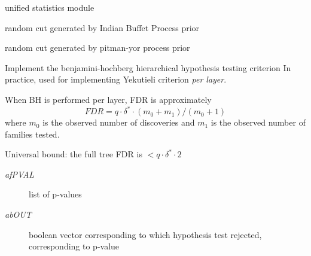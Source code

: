 \documentclass[letterpaper,10pt,english]{sphinxmanual}
\begin{document}
\begin{fulllineitems}
\end{fulllineitems}

\label{index:module-halla.stats}
unified statistics module

\begin{fulllineitems}
\label{index:halla.stats.IBP_cut}
random cut generated by Indian Buffet Process prior

\end{fulllineitems}


\begin{fulllineitems}
\label{index:halla.stats.PY_cut}
random cut generated by pitman-yor process prior

\end{fulllineitems}


\begin{fulllineitems}
\label{index:halla.stats.bh}
Implement the benjamini-hochberg hierarchical hypothesis testing criterion 
In practice, used for implementing Yekutieli criterion \emph{per layer}.

When BH is performed per layer, FDR is approximately
\begin{equation}FDR = q \cdot \delta^{*} \cdot(m_0 + m_1)/(m_0+1)\end{equation}
where $m_0$ is the observed number of discoveries and $m_1$ is the observed number of families tested.

Universal bound: the full tree FDR is $< q \cdot \delta^{*} \cdot 2$
\begin{description}
\item[{\emph{afPVAL}}] \leavevmode
list of p-values

\item[{\emph{abOUT}}] \leavevmode
boolean vector corresponding to which hypothesis test rejected, corresponding to p-value

\end{description}

\end{fulllineitems}
\end{document}
